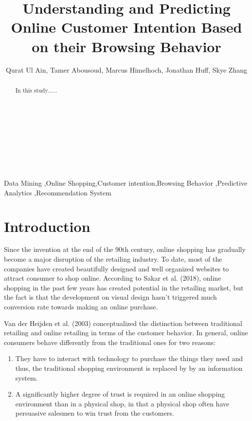 \documentclass[final, 3p,12pt,times,letter,twocolumn]{elsarticle}
\begin{document}

\begin{frontmatter}
\title{Understanding and Predicting Online Customer Intention Based on their Browsing Behavior
}


\author{Qurat Ul Ain, Tamer Abousoud, Marcus Himelhoch, Jonathan Huff, Skye  Zhang}
\address{Graham School of Continuing Liberal and Professional Studies, the University of Chicago}
\begin{abstract}
In this study...... 
\\
\\
\\
\\
\\
\\
\\
\\

\end{abstract}

\begin{keyword}
Data Mining \sep Online Shopping\sep Customer intention\sep Browsing Behavior \sep Predictive Analytics \sep Recommendation System
\end{keyword}

\end{frontmatter}


\section{Introduction}
Since the invention at the end of the 90th century, online shopping has gradually become a major disruption of the retailing industry. To date, most of the companies have created beautifully designed and well organized websites to attract consumer to shop online. According to Sakar et al. (2018), online shopping in the past few years has created potential in the retailing market, but the fact is that the development on visual design hasn't triggered much conversion rate towards making an online purchase.

Van der Heijden et al. (2003) conceptualized the distinction between traditional retailing and online retailing in terms of the customer behavior. In general, online consumers behave differently from the traditional ones for two reasons: 
\begin{enumerate}[(1)]
\item They have to interact with technology to purchase the things they need and thus, the traditional shopping environment is replaced by by an information system.
\item A significantly higher degree of trust is required in an online shopping environment than in a physical shop, in that a physical shop often have persuasive salesmen to win trust from the customers.
\end{enumerate}
\end{document}
